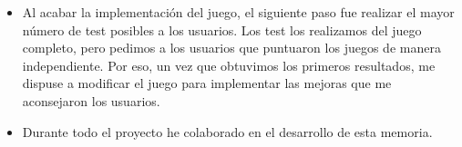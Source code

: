 \begin{itemize}

\item{Al acabar la implementación del juego, el siguiente paso fue realizar el mayor número de test posibles a los usuarios. Los test los realizamos del juego completo, pero pedimos a los usuarios que puntuaron los juegos de manera independiente. Por eso, un vez que obtuvimos los primeros resultados, me dispuse a modificar el juego para implementar las mejoras que me aconsejaron los usuarios.}

\item{Durante todo el proyecto he colaborado en el desarrollo de esta memoria.}

\end{itemize}
